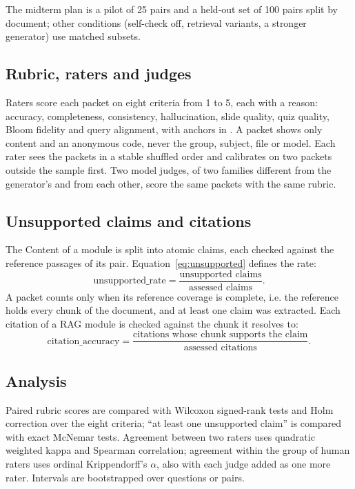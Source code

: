 The midterm plan is a pilot of 25 pairs and a held-out set of 100 pairs split by document; other conditions (self-check off, retrieval variants, a stronger generator) use matched subsets.
\subsection{Rubric, raters and judges}
Raters score each packet on eight criteria from 1 to 5, each with a reason: accuracy, completeness, consistency, hallucination, slide quality, quiz quality, Bloom fidelity and query alignment, with anchors in . A packet shows only content and an anonymous code, never the group, subject, file or model. Each rater sees the packets in a stable shuffled order and calibrates on two packets outside the sample first. Two model judges, of two families different from the generator's and from each other, score the same packets with the same rubric.
\subsection{Unsupported claims and citations}
The Content of a module is split into atomic claims\citep{factscore}, each checked against the reference passages of its pair. Equation~\ref{eq:unsupported} defines the rate:
\begin{equation}\label{eq:unsupported}
\mathrm{unsupported\_rate}=\frac{\text{unsupported claims}}{\text{assessed claims}}.
\end{equation}
A packet counts only when its reference coverage is complete, i.e. the reference holds every chunk of the document, and at least one claim was extracted. Each citation of a RAG module is checked against the chunk it resolves to\citep{alce}:
\begin{equation}\label{eq:citation}
\mathrm{citation\_accuracy}=\frac{\text{citations whose chunk supports the claim}}{\text{assessed citations}}.
\end{equation}
\subsection{Analysis}
Paired rubric scores are compared with Wilcoxon signed-rank tests\citep{wilcoxon} and Holm correction over the eight criteria\citep{holm}; ``at least one unsupported claim'' is compared with exact McNemar tests. Agreement between two raters uses quadratic weighted kappa\citep{weightedkappa} and Spearman correlation\citep{spearman}; agreement within the group of human raters uses ordinal Krippendorff's $\alpha$\citep{krippendorff}, also with each judge added as one more rater. Intervals are bootstrapped over questions or pairs\citep{bootstrap}.
